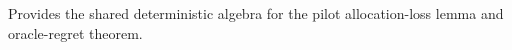 Provides the shared deterministic algebra for the pilot allocation-loss lemma and oracle-regret theorem.